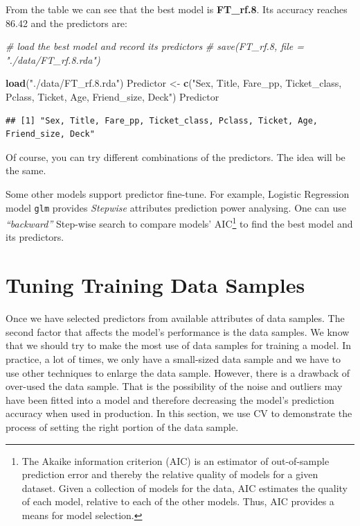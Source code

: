 \documentclass[
]{book}
\newenvironment{Shaded}{\begin{snugshade}}{\end{snugshade}}
\newcommand{\CommentTok}[1]{\textcolor[rgb]{0.56,0.35,0.01}{\textit{#1}}}
\newcommand{\KeywordTok}[1]{\textcolor[rgb]{0.13,0.29,0.53}{\textbf{#1}}}
\newcommand{\NormalTok}[1]{#1}
\newcommand{\StringTok}[1]{\textcolor[rgb]{0.31,0.60,0.02}{#1}}
\begin{document}
From the table we can see that the best model is \textbf{FT\_rf.8}. Its accuracy reaches 86.42 and the predictors are:

\begin{Shaded}
\begin{Highlighting}[]
\CommentTok{# load the best model and record its predictors}
\CommentTok{# save(FT_rf.8, file = "./data/FT_rf.8.rda")}

\KeywordTok{load}\NormalTok{(}\StringTok{"./data/FT_rf.8.rda"}\NormalTok{)}
\NormalTok{Predictor <-}\StringTok{ }\KeywordTok{c}\NormalTok{(}\StringTok{"Sex, Title, Fare_pp, Ticket_class, Pclass, Ticket, Age, Friend_size, Deck"}\NormalTok{)}
\NormalTok{Predictor}
\end{Highlighting}
\end{Shaded}

\begin{verbatim}
## [1] "Sex, Title, Fare_pp, Ticket_class, Pclass, Ticket, Age, Friend_size, Deck"
\end{verbatim}

Of course, you can try different combinations of the predictors. The idea will be the same.

Some other models support predictor fine-tune. For example, Logistic Regression model \texttt{glm} provides \emph{Stepwise} attributes prediction power analysing. One can use \emph{``backward''} Step-wise search to compare models' AIC\footnote{The Akaike information criterion (AIC) is an estimator of out-of-sample prediction error and thereby the relative quality of models for a given dataset. Given a collection of models for the data, AIC estimates the quality of each model, relative to each of the other models. Thus, AIC provides a means for model selection.} to find the best model and its predictors.

\hypertarget{tuning-training-data-samples}{%
\section{Tuning Training Data Samples}\label{tuning-training-data-samples}}

Once we have selected predictors from available attributes of data samples. The second factor that affects the model's performance is the data samples. We know that we should try to make the most use of data samples for training a model. In practice, a lot of times, we only have a small-sized data sample and we have to use other techniques to enlarge the data sample. However, there is a drawback of over-used the data sample. That is the possibility of the noise and outliers may have been fitted into a model and therefore decreasing the model's prediction accuracy when used in production. In this section, we use CV to demonstrate the process of setting the right portion of the data sample.
\end{document}
